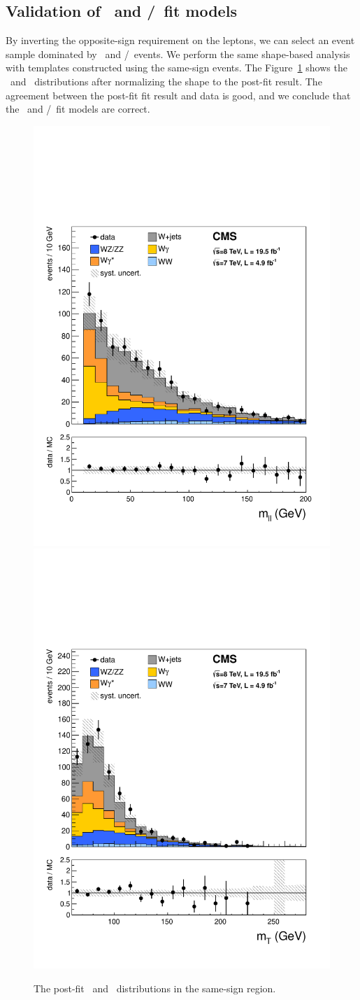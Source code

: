 \subsection{Validation of \Wjets\ and \wgamma/\wgammastar\ fit models}  

By inverting the opposite-sign requirement on the leptons, 
we can select an event sample dominated by \Wjets\ and \wgamma/\wgammastar\ events. 
We perform the same shape-based analysis
with templates constructed using the same-sign events.
The Figure~\ref{fig:ssCRfit} shows the \mll\ and \mT\ distributions
after normalizing the shape to the post-fit result. The agreement
between the post-fit fit result and data is good, and we conclude
that the \Wjets\ and \wgamma/\wgammastar\ fit models are correct.

\begin{figure}[!hbtp] 
\begin{center}
    \includegraphics[width=.47\textwidth]{figures/SS_mll_0j.pdf}
    \includegraphics[width=.47\textwidth]{figures/SS_mT_0j.pdf}
    \caption{The post-fit \mll\ and \mT\ distributions in the same-sign region.} 
    \label{fig:ssCRfit}
\end{center}
\end{figure}



